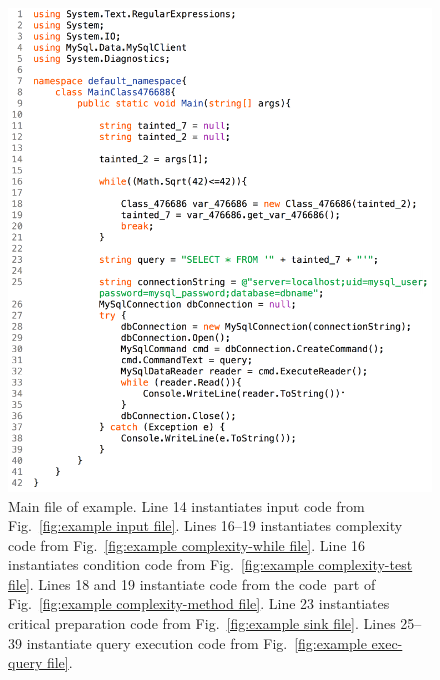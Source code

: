 \begin{figure}[tbp]
  \includegraphics[width=\linewidth]{fig_example_code1.png}
  \caption{Main file of example. Line 14 instantiates input code from 
    Fig.~\ref{fig:example input file}. Lines 16--19 instantiates complexity code from 
    Fig.~\ref{fig:example complexity-while file}. Line 16 instantiates condition code from
    Fig.~\ref{fig:example complexity-test file}.  Lines 18 and 19 instantiate code from the
    \texlangle code\texrangle\  part of Fig.~\ref{fig:example complexity-method file}.
    Line 23 instantiates critical preparation code from Fig.~\ref{fig:example sink file}.
    Lines 25--39 instantiate query execution code from Fig.~\ref{fig:example exec-query file}.
  }
  \label{fig:example main file}
\end{figure}

